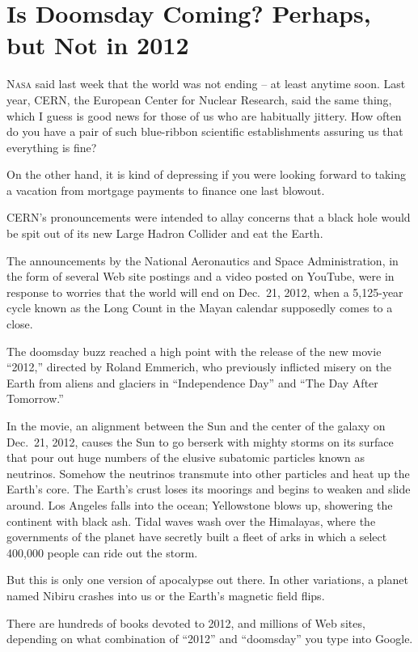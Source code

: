 ﻿\documentclass[12pt]{article}
\begin{document}
\section{Is Doomsday Coming? Perhaps, but Not in 2012}

\lettrine{N}{asa} said last week that the world was not ending -- at least
anytime soon. Last year, CERN, the European Center for Nuclear Research, said the same thing, which
I guess is good news for those of us who are habitually jittery. How often do you have a pair of
such blue-ribbon scientific establishments assuring us that everything is fine?

On the other hand, it is kind of depressing if you were looking forward to taking a vacation from
mortgage payments to finance one last blowout.

CERN's pronouncements were intended to allay concerns that a black hole would be spit out of its new
Large Hadron Collider and eat the Earth.

The announcements by the National Aeronautics and Space Administration, in the form of several Web
site postings and a video posted on YouTube, were in response to worries that the world will end on
Dec.~21, 2012, when a 5,125-year cycle known as the Long Count in the Mayan calendar supposedly
comes to a close.

The doomsday buzz reached a high point with the release of the new movie ``2012,'' directed by
Roland Emmerich, who previously inflicted misery on the Earth from aliens and glaciers in
``Independence Day'' and ``The Day After Tomorrow.''

In the movie, an alignment between the Sun and the center of the galaxy on Dec.~21, 2012, causes the
Sun to go berserk with mighty storms on its surface that pour out huge numbers of the elusive
subatomic particles known as neutrinos. Somehow the neutrinos transmute into other particles and
heat up the Earth's core. The Earth's crust loses its moorings and begins to weaken and slide
around. Los Angeles falls into the ocean; Yellowstone blows up, showering the continent with black
ash. Tidal waves wash over the Himalayas, where the governments of the planet have secretly built a
fleet of arks in which a select 400,000 people can ride out the storm.

But this is only one version of apocalypse out there. In other variations, a planet named Nibiru
crashes into us or the Earth's magnetic field flips.

There are hundreds of books devoted to 2012, and millions of Web sites, depending on what
combination of ``2012'' and ``doomsday'' you type into Google.
\end{document}
